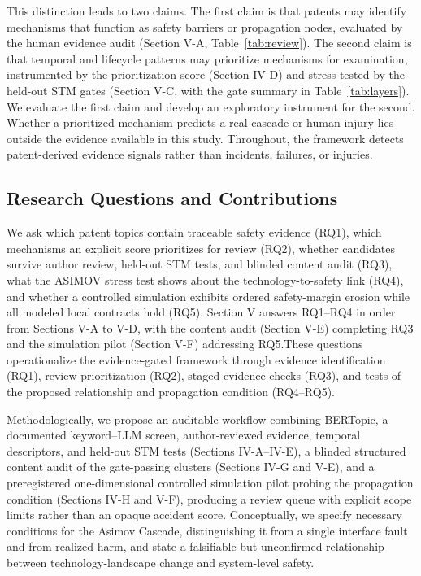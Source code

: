 \documentclass[letterpaper,9pt,conference]{ieeeconf}
\begin{document}
This distinction leads to two claims. The first claim is that patents may identify mechanisms that function as safety barriers or propagation nodes, evaluated by the human evidence audit (Section V-A, Table~\ref{tab:review}). The second claim is that temporal and lifecycle patterns may prioritize mechanisms for examination, instrumented by the prioritization score (Section IV-D) and stress-tested by the held-out STM gates (Section V-C, with the gate summary in Table~\ref{tab:layers}). We evaluate the first claim and develop an exploratory instrument for the second. Whether a prioritized mechanism predicts a real cascade or human injury lies outside the evidence available in this study. Throughout, the framework detects patent-derived evidence signals rather than incidents, failures, or injuries.

\subsection{Research Questions and Contributions}

We ask which patent topics contain traceable safety evidence (RQ1), which mechanisms an explicit score prioritizes for review (RQ2), whether candidates survive author review, held-out STM tests, and blinded content audit (RQ3), what the ASIMOV stress test shows about the technology-to-safety link (RQ4), and whether a controlled simulation exhibits ordered safety-margin erosion while all modeled local contracts hold (RQ5). Section V answers RQ1--RQ4 in order from Sections V-A to V-D, with the content audit (Section V-E) completing RQ3 and the simulation pilot (Section V-F) addressing RQ5.These questions operationalize the evidence-gated framework through evidence identification (RQ1), review prioritization (RQ2), staged evidence checks (RQ3), and tests of the proposed relationship and propagation condition (RQ4--RQ5).

Methodologically, we propose an auditable workflow combining BERTopic, a documented keyword--LLM screen, author-reviewed evidence, temporal descriptors, and held-out STM tests (Sections IV-A--IV-E), a blinded structured content audit of the gate-passing clusters (Sections IV-G and V-E), and a preregistered one-dimensional controlled simulation pilot probing the propagation condition (Sections IV-H and V-F), producing a review queue with explicit scope limits rather than an opaque accident score. Conceptually, we specify necessary conditions for the Asimov Cascade, distinguishing it from a single interface fault and from realized harm, and state a falsifiable but unconfirmed relationship between technology-landscape change and system-level safety.
\end{document}
